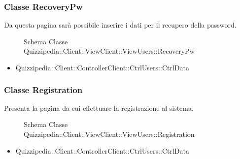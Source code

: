 \subsubsection{Classe RecoveryPw}
Da questa pagina sarà possibile inserire i dati per il recupero della password.
\begin{figure}[H]
\centering
\noindent{}
\caption[Schema Classe RecoveryPw]{Schema Classe Quizzipedia::Client::ViewClient::ViewUsers::RecoveryPw}
\end{figure}
\begin{itemize}
\item Quizzipedia::Client::ControllerClient::CtrlUsers::CtrlData
\end{itemize}
\subsubsection{Classe Registration}
Presenta la pagina da cui effettuare la  registrazione al sistema.
\begin{figure}[H]
\centering
\noindent{}
\caption[Schema Classe Registration]{Schema Classe Quizzipedia::Client::ViewClient::ViewUsers::Registration}
\end{figure}
\begin{itemize}
\item Quizzipedia::Client::ControllerClient::CtrlUsers::CtrlData
\end{itemize}
